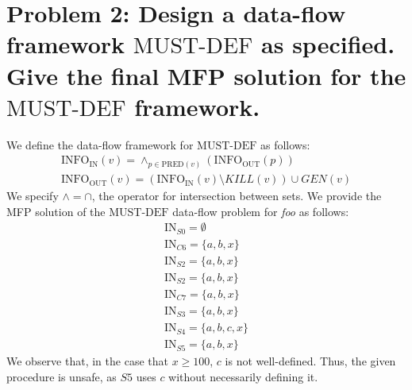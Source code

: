 \documentclass[12pt]{article}
\begin{document}
\section*{Problem 2: Design a data-flow framework $\text{MUST-DEF}$ as specified. Give the final MFP solution for the $\text{MUST-DEF}$ framework.}
We define the data-flow framework for $\text{MUST-DEF}$ as follows:
\begin{align*}
  \text{INFO}_{\text{IN}}(v) = \wedge_{p \in \text{PRED}(v)}(\text{INFO}_{\text{OUT}}(p)) \nonumber \\
  \text{INFO}_{\text{OUT}}(v) = (\text{INFO}_{\text{IN}}(v) \setminus KILL(v)) \cup GEN(v) \nonumber
\end{align*}
We specify $\wedge = \cap$, the operator for intersection between sets. We provide the MFP solution of the $\text{MUST-DEF}$ data-flow problem for \textit{foo} as follows:
\begin{align*}
  \text{IN}_{S0} = \emptyset \nonumber \\
  \text{IN}_{C6} = \{a, b, x\} \nonumber \\
  \text{IN}_{S2} = \{a, b, x\} \nonumber \\
  \text{IN}_{S2} = \{a, b, x\} \nonumber \\
  \text{IN}_{C7} = \{a, b, x\} \nonumber \\
  \text{IN}_{S3} = \{a, b, x\} \nonumber \\
  \text{IN}_{S4} = \{a, b, c, x\} \nonumber \\
  \text{IN}_{S5} = \{a, b, x\} \nonumber
\end{align*}
We observe that, in the case that $x \geq 100$, $c$ is not well-defined. Thus, the given procedure is unsafe, as $S5$ uses $c$ without necessarily defining it.
\end{document}
